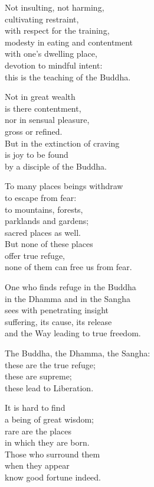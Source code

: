 Not insulting, not harming,\\
cultivating restraint,\\
with respect for the training,\\
modesty in eating and contentment\\
with one's dwelling place,\\
devotion to mindful intent:\\
this is the teaching of the Buddha.


Not in great wealth\\
is there contentment,\\
nor in sensual pleasure,\\
gross or refined.\\
But in the extinction of craving\\
is joy to be found\\
by a disciple of the Buddha.


To many places beings withdraw\\
to escape from fear:\\
to mountains, forests,\\
parklands and gardens;\\
sacred places as well.\\
But none of these places\\
offer true refuge,\\
none of them can free us from fear.


One who finds refuge in the Buddha\\
in the Dhamma and in the Sangha\\
sees with penetrating insight\\
suffering, its cause, its release\\
and the Way leading to true freedom.


The Buddha, the Dhamma, the Sangha:\\
these are the true refuge;\\
these are supreme;\\
these lead to Liberation.


It is hard to find\\
a being of great wisdom;\\
rare are the places\\
in which they are born.\\
Those who surround them\\
when they appear\\
know good fortune indeed.


